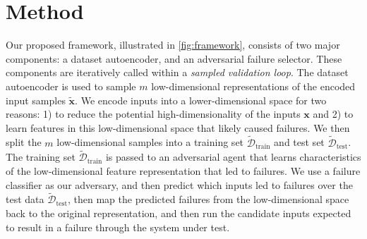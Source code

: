 \section{Method}
Our proposed framework, illustrated in \cref{fig:framework}, consists of two major components: a dataset autoencoder, and an adversarial failure selector. These components are iteratively called within a \textit{sampled validation loop}. The dataset autoencoder is used to sample $m$ low-dimensional representations of the encoded input samples $\tilde{\mathbf{x}}$. We encode inputs into a lower-dimensional space for two reasons: 1) to reduce the potential high-dimensionality of the inputs $\mathbf{x}$ and 2) to learn features in this low-dimensional space that likely caused failures.
We then split the $m$ low-dimensional samples into a training set $\tilde{\mathcal{D}}_\text{train}$ and test set $\tilde{\mathcal{D}}_\text{test}$.
The training set $\tilde{\mathcal{D}}_\text{train}$ is passed to an adversarial agent that learns characteristics of the low-dimensional feature representation that led to failures.
We use a failure classifier as our adversary, and then predict which inputs led to failures over the test data $\tilde{\mathcal{D}}_\text{test}$, then map the predicted failures from the low-dimensional space back to the original representation, and then run the candidate inputs expected to result in a failure through the system under test.


